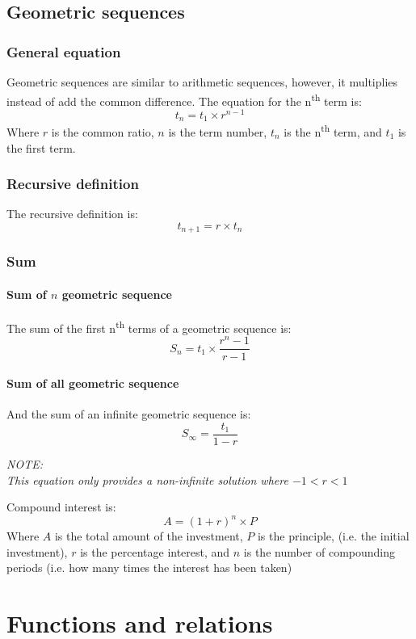\documentclass{book}
\newenvironment{note}{\begin{center}\em NOTE:\\}{\end{center}}
\begin{document}
\section{Geometric sequences}
\subsection{General equation}
Geometric sequences are similar to arithmetic sequences, however, it multiplies instead of add the common difference.  The equation for the n\textsuperscript{th} term is:
\[
	t_n = t_1 \times r^{n - 1}
\]
Where $r$ is the common ratio, $n$ is the term number, $t_n$ is the n\textsuperscript{th} term, and $t_1$ is the first term.

\subsection{Recursive definition}
The recursive definition is:
\[
	t_{n + 1} = r \times t_n
\]

\subsection{Sum}
\subsubsection{Sum of $n$ geometric sequence}
The sum of the first n\textsuperscript{th} terms of a geometric sequence is:
\[
	S_n = t_1 \times \frac{r^n - 1}{r - 1}
\]

\subsubsection{Sum of all geometric sequence}
And the sum of an infinite geometric sequence is:
\[
	S_{\infty} = \frac{t_1}{1 - r}
\]
\begin{note}
	This equation only provides a non-infinite solution where $-1 < r < 1$
\end{note}

Compound interest is:
\[
	A = (1 + r)^n \times P
\]
Where $A$ is the total amount of the investment, $P$ is the principle, (i.e. the initial investment), $r$ is the percentage interest, and $n$ is the number of compounding periods (i.e. how many times the interest has been taken)

\chapter{Functions and relations}
\end{document}
